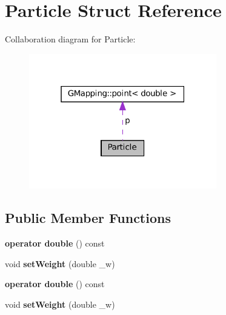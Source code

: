 \hypertarget{structParticle}{}\section{Particle Struct Reference}
\label{structParticle}


Collaboration diagram for Particle\+:
\nopagebreak
\begin{figure}[H]
\begin{center}
\leavevmode
\includegraphics[width=232pt]{structParticle__coll__graph}
\end{center}
\end{figure}
\subsection*{Public Member Functions}
\begin{DoxyCompactItemize}
\item 
\mbox{\label{structParticle_a9c5c8124757d0129d528717e881b5594}} 
{\bfseries operator double} () const
\item 
\mbox{\label{structParticle_a4cf167d74db2e4f0d5aadc1dfd2f850e}} 
void {\bfseries set\+Weight} (double \+\_\+w)
\item 
\mbox{\label{structParticle_a9c5c8124757d0129d528717e881b5594}} 
{\bfseries operator double} () const
\item 
\mbox{\label{structParticle_a4cf167d74db2e4f0d5aadc1dfd2f850e}} 
void {\bfseries set\+Weight} (double \+\_\+w)
\end{DoxyCompactItemize}
